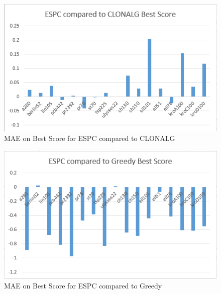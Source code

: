 \begin{figure}[H]
	\includegraphics[]{Images/ESPC_Fig_Best.png}
	\caption{MAE on Best Score for ESPC compared to CLONALG}
	\label{ESCP_Best}
\end{figure}
\begin{figure}[H]
	\includegraphics[]{Images/ESPC_Fig_Greedy.png}
	\caption{MAE on Best Score for ESPC compared to Greedy}
	\label{ESCP_Greedy}
\end{figure}
